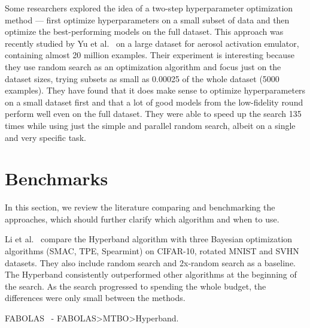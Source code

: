Some researchers explored the idea of a two-step hyperparameter optimization method --- first optimize hyperparameters on a small subset of data and then optimize the best-performing models on the full dataset. This approach was recently studied by Yu et al.~\cite{yu2024two} on a large dataset for aerosol activation emulator, containing almost 20 million examples. Their experiment is interesting because they use random search as an optimization algorithm and focus just on the dataset sizes, trying subsets as small as 0.00025 of the whole dataset (5000 examples). They have found that it does make sense to optimize hyperparameters on a small dataset first and that a lot of good models from the low-fidelity round perform well even on the full dataset. They were able to speed up the search 135 times while using just the simple and parallel random search, albeit on a single and very specific task.



\section{Benchmarks}
In this section, we review the literature comparing and benchmarking the approaches, which should further clarify which algorithm and when to use.


Li et al.~\cite{li2018hyperband} compare the Hyperband algorithm with three Bayesian optimization algorithms (SMAC, TPE, Spearmint) on CIFAR-10, rotated MNIST and SVHN datasets. They also include random search and 2x-random search as a baseline. The Hyperband consistently outperformed other algorithms at the beginning of the search. As the search progressed to spending the whole budget, the differences were only small between the methods.

FABOLAS~\cite{klein2017fast} - FABOLAS>MTBO>Hyperband.